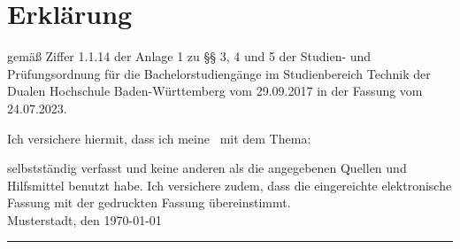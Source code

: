%
%
%
%

\chapter*{Erklärung} %

gemäß Ziffer 1.1.14 der Anlage 1 zu §§ 3, 4 und 5  der Studien- und Prüfungsordnung für die Bachelorstudiengänge im Studienbereich Technik der Dualen Hochschule Baden-Württemberg vom 29.09.2017 in der Fassung vom 24.07.2023.

Ich versichere hiermit, dass ich meine \arbeit\ mit dem Thema:

\begin{quote}
	\textit{\titel} %
\end{quote}

selbstständig verfasst und keine anderen als die angegebenen Quellen und Hilfsmittel benutzt habe. Ich versichere zudem, dass die eingereichte elektronische Fassung mit der gedruckten Fassung übereinstimmt.\\[6ex]

Musterstadt, den \today \\[1ex]

\rule[-0.2cm]{5cm}{0.5pt} \\

\autor \\[10ex]

\rmfamily

\thispagestyle{empty}

